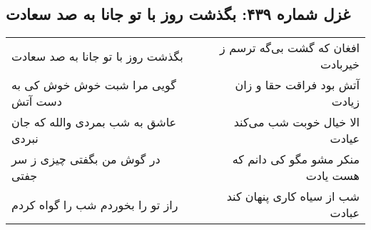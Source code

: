 \begin{center}
\section*{غزل شماره ۴۳۹: بگذشت روز با تو جانا به صد سعادت}
\label{sec:0439}
\begin{longtable}{l p{0.5cm} r}
بگذشت روز با تو جانا به صد سعادت
&&
افغان که گشت بی‌گه ترسم ز خیربادت
\\
گویی مرا شبت خوش خوش کی به دست آتش
&&
آتش بود فراقت حقا و زان زیادت
\\
عاشق به شب بمردی والله که جان نبردی
&&
الا خیال خوبت شب می‌کند عیادت
\\
در گوش من بگفتی چیزی ز سر جفتی
&&
منکر مشو مگو کی دانم که هست یادت
\\
راز تو را بخوردم شب را گواه کردم
&&
شب از سیاه کاری پنهان کند عبادت
\\
\end{longtable}
\end{center}

